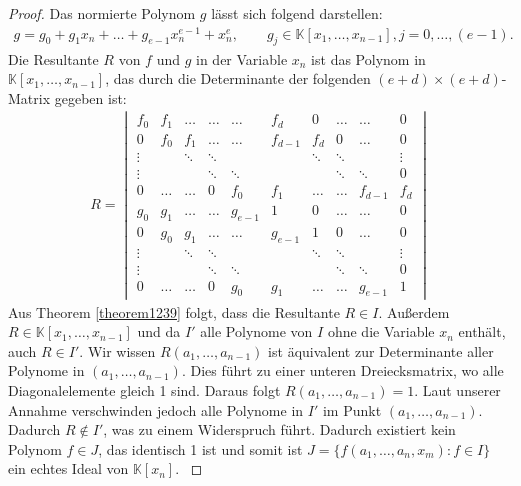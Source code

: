 \begin{proof}
Das normierte Polynom $g$ lässt sich folgend darstellen:
\begin{align*}
g=g_0+g_1x_n+\ldots+g_{e-1}x_n^{e-1}+x_n^e, \qquad g_j \in \mathbb{K}[x_1,\ldots,x_{n-1}], j = 0,\ldots,(e-1).
\end{align*}
Die Resultante $R$ von $f$ und $g$ in der Variable $x_n$ ist das Polynom in $\mathbb{K}[x_1,\ldots,x_{n-1}]$, das durch die Determinante der folgenden $(e+d)\times(e+d)$-Matrix gegeben ist: 
\begin{align*}
R = 
\begin{vmatrix}
f_0 & f_1 &\dots & \dots & \dots & f_d & 0 & \dots & \dots & 0 \\
0   & f_0 & f_1 &\dots & \dots & f_{d-1} & f_d & 0 & \dots & 0\\
\vdots &  & \ddots & \ddots & & & \ddots & \ddots & & \vdots \\
\vdots &  &  & \ddots & \ddots & & & \ddots & \ddots & 0 \\
0 & \dots & \dots & 0 & f_0 & f_1 & \dots & \dots & f_{d-1} & f_d \\
g_0 & g_1 &\dots & \dots & g_{e-1} & 1 & 0 & \dots & \dots & 0 \\
0  & g_0 & g_1 &\dots & \dots & g_{e-1} & 1 & 0 & \dots & 0\\
\vdots &  & \ddots & \ddots & & & \ddots & \ddots & & \vdots \\
\vdots &  &  & \ddots & \ddots & & & \ddots & \ddots & 0 \\
0 & \dots & \dots & 0 & g_0 & g_1 & \dots & \dots & g_{e-1} & 1
\end{vmatrix}
\end{align*}
Aus Theorem \ref{theorem1239} folgt, dass die Resultante $R \in I$. Außerdem $R \in \mathbb{K}[x_1,\ldots,x_{n-1}]$ und da $I'$ alle Polynome von $I$ ohne die Variable $x_n$ enthält, auch $R \in I'$. Wir wissen $R(a_1,\ldots,a_{n-1})$ ist äquivalent zur Determinante aller Polynome in $(a_1,\ldots,a_{n-1})$. Dies führt zu einer unteren Dreiecksmatrix, wo alle Diagonalelemente gleich 1 sind. Daraus folgt $R(a_1,\ldots,a_{n-1}) = 1$. Laut unserer Annahme verschwinden jedoch alle Polynome in $I'$ im Punkt $(a_1,\ldots,a_{n-1})$. Dadurch $R \notin I'$, was zu einem Widerspruch führt. Dadurch existiert kein Polynom $f \in J$, das identisch 1 ist und somit ist $J= \{f(a_1,\ldots,a_n,x_m):f\in I\}$ ein echtes Ideal von $\mathbb{K}[x_n]$.   
\cite{Ausgangsartikel}  
\end{proof} 

